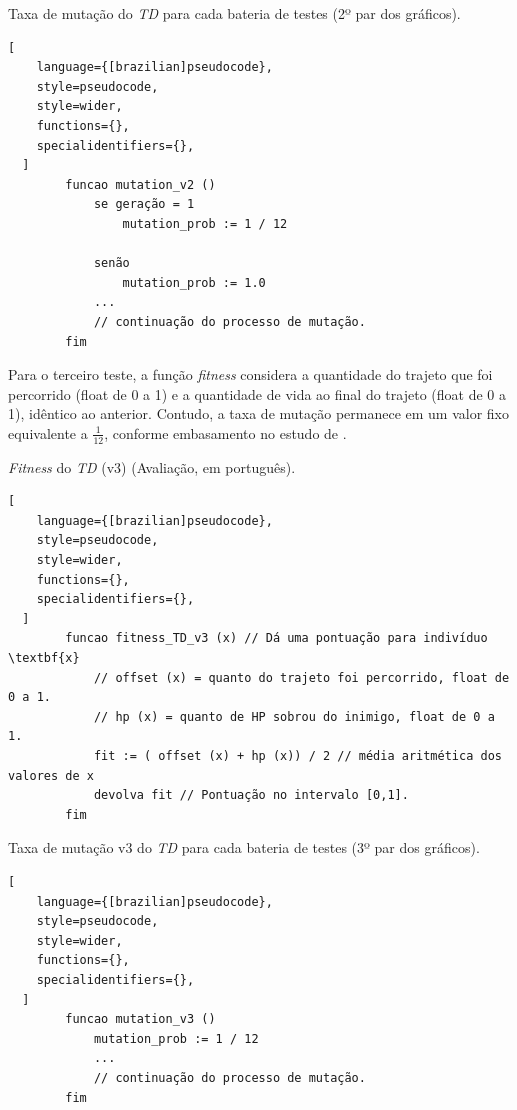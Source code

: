 \begin{programruledcaption}{Taxa de mutação do \textit{TD} para cada bateria de testes (2º par dos gráficos).\label{prog:mutacao_TD2}}
  \begin{lstlisting}[
    language={[brazilian]pseudocode},
    style=pseudocode,
    style=wider,
    functions={},
    specialidentifiers={},
  ]
        funcao mutation_v2 () 
            se geração = 1
		        mutation_prob := 1 / 12
		        
		    senão
		        mutation_prob := 1.0
		    ...
		    // continuação do processo de mutação.
        fim
  \end{lstlisting}
\end{programruledcaption}

Para o terceiro teste, a função \textit{fitness} considera a quantidade do trajeto que foi percorrido (float de 0 a 1) e a quantidade de vida ao final do trajeto (float de 0 a 1), idêntico ao anterior. Contudo, a taxa de mutação permanece em um valor fixo equivalente a $\frac{1}{12}$, conforme embasamento no estudo de \citet{haupt00:mutationprob}.

\begin{programruledcaption}{\textit{Fitness} do \textit{TD} (v3) (Avaliação, em português).\label{prog:avaliacao_TD3}}
  \begin{lstlisting}[
    language={[brazilian]pseudocode},
    style=pseudocode,
    style=wider,
    functions={},
    specialidentifiers={},
  ]
        funcao fitness_TD_v3 (x) // Dá uma pontuação para indivíduo \textbf{x}
            // offset (x) = quanto do trajeto foi percorrido, float de 0 a 1.
            // hp (x) = quanto de HP sobrou do inimigo, float de 0 a 1.
	        fit := ( offset (x) + hp (x)) / 2 // média aritmética dos valores de x
	        devolva fit // Pontuação no intervalo [0,1].
        fim
  \end{lstlisting}
\end{programruledcaption}

\begin{programruledcaption}{Taxa de mutação  v3 do \textit{TD} para cada bateria de testes (3º par dos gráficos).\label{prog:mutacao_TD3}}
  \begin{lstlisting}[
    language={[brazilian]pseudocode},
    style=pseudocode,
    style=wider,
    functions={},
    specialidentifiers={},
  ]
        funcao mutation_v3 () 
            mutation_prob := 1 / 12
		    ...
		    // continuação do processo de mutação.
        fim
  \end{lstlisting}
\end{programruledcaption}

